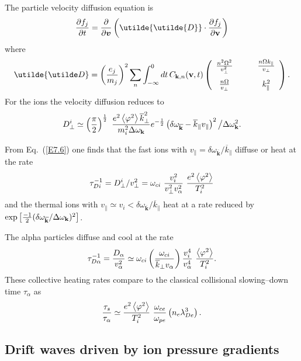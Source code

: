 \documentclass[a4paper,openany,12pt]{report}
\begin{document}
The particle velocity diffusion equation is
%
\begin{equation}
{\partial f_j\over\partial t}={\partial\over\partial\bm{v}}\left(\utilde{\utilde{D}}\cdot{\partial f_j\over\partial\mathbf{v}}\right)\label{E7.6}
\end{equation}
where
\begin{equation}
\utilde{\utilde D}=\left({e_j\over m_j}\right)^2\sum_n\int_{-\infty}^0 dt\, C_{\mathbf{k}, n}(\mathbf{v}, t)\left(\begin{array}{cc} {n^2\Omega^2\over v^2_\perp}  &\qquad{n\Omega k_\|\over v_\perp}\\[10pt]
{n\Omega\over v_\perp}  &\qquad k^2_\|\end{array}\right).\label{E7.7}
\end{equation}
For the ions the velocity diffusion reduces to 
\begin{equation}
D^i_\perp\simeq\left({\pi\over 2}\right)^{1\over 2}\ {e^2\left<\varphi^2\right>\overline k^2_\perp\over m_i^2\Delta\omega_{\mathbf k}} 
e^{-{1\over 2}}\left(\delta\omega_{\overline{\mathbf k}}-\overline k_\| v_\|\right)^2\big/\Delta\omega^2_{\mathbf{k}}.\label{E7.8}
\end{equation}

From Eq.~(\ref{E7.6}) one finds that the fast ions with $v_\|=\delta\omega_{\overline{\mathbf{k}}}/\overline k_\|$ diffuse or heat at the rate
$$\tau^{-1}_{Di}=D^i_\perp/v^2_\perp=\omega_{ci}\ {v^2_i\over v^2_\perp v^2_\alpha}\ {e^2\left<\varphi^2\right>\over T^2_i}$$
and the thermal ions with $v_\|\simeq v_i<\delta\omega_{\overline{\mathbf{k}}}/\overline k_\|$ heat at a rate reduced by $\exp\left[{-1\over 2} (\delta\omega_{\overline{\mathbf{k}}}/\Delta\omega_{\mathbf{k}})^2\right]$.

The alpha particles diffuse and cool at the rate
$$\tau^{-1}_{D\alpha}={D_\alpha\over v^2_\alpha}\simeq\omega_{ci}\left({\omega_{ci}\over\overline k_\perp v_\alpha}\right) {v^4_i\over v^4_\alpha}\ {\left<\varphi^2\right>\over T^2_i}.$$
These collective heating rates compare to the classical collisional slowing--down time $\tau_\alpha$ as
\begin{equation}
{\tau_s\over\tau_\alpha}\simeq{e^2\left<\varphi^2\right>\over T^2_i}\ {\omega_{ce}\over\omega_{pe}}\left(n_e\lambda^3_{De}\right).\label{E7.9}
\end{equation}
%
\subsection{Drift waves driven by ion pressure gradients}
\end{document}
